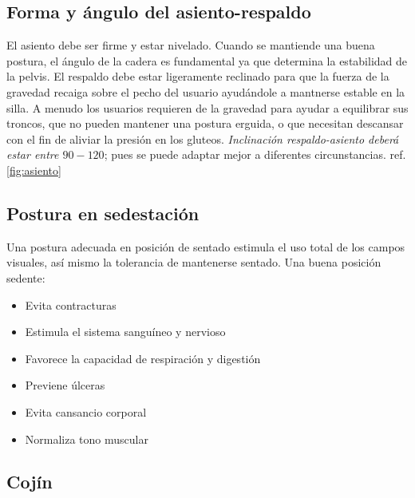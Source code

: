 \subsection{Forma y \'angulo del asiento-respaldo}

El asiento debe ser firme y estar nivelado. Cuando se mantiende una buena
postura, el \'angulo de la cadera es fundamental ya que determina la estabilidad
de la pelvis. El respaldo debe estar ligeramente reclinado para que la fuerza de
la gravedad recaiga sobre el pecho del usuario ayud\'andole a mantnerse estable
en la silla. A menudo los usuarios requieren de la gravedad para ayudar a
equilibrar sus troncos, que no pueden mantener una postura erguida, o que
necesitan descansar con el fin de aliviar la presi\'on en los gluteos.
\emph{Inclinaci\'on respaldo-asiento deber\'a estar entre $90-120$\textdegree};
pues se puede adaptar mejor a diferentes circunstancias. ref. \ref{fig:asiento}

\subsection{Postura en sedestaci\'on}

Una postura adecuada en posici\'on de sentado estimula el uso total de los
campos visuales, as\'i mismo la tolerancia de mantenerse sentado. Una buena
posici\'on sedente:
\begin{itemize}
    \item Evita contracturas
    \item Estimula el sistema sangu\'ineo y nervioso
    \item Favorece la capacidad de respiraci\'on y digesti\'on
    \item Previene \'ulceras
    \item Evita cansancio corporal
    \item Normaliza tono muscular
\end{itemize}

\subsection{Coj\'in}

